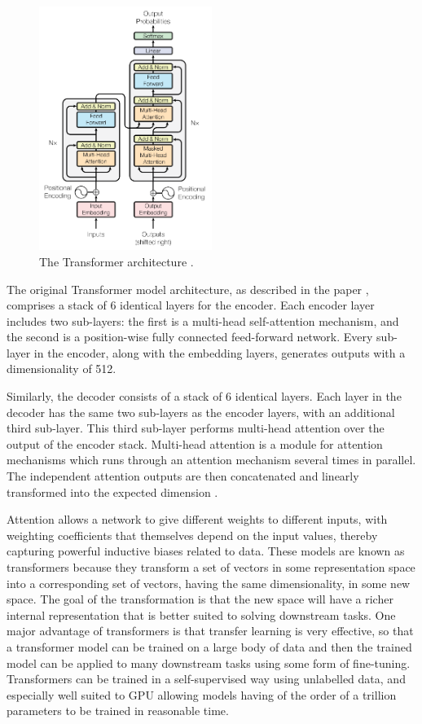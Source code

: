 \begin{figure}[h!]
\centering
\includegraphics[width=0.5\textwidth]{Figures/transformer.png}
\caption{The Transformer architecture \cite{Vaswani.12Jun2017}.}
\label{fig:transformer}
\end{figure}

The original Transformer model architecture, as described in the paper \cite{Vaswani.12Jun2017}, comprises a stack of 6 identical layers for the encoder. Each encoder layer includes two sub-layers: the first is a multi-head self-attention mechanism, and the second is a position-wise fully connected feed-forward network. Every sub-layer in the encoder, along with the embedding layers, generates outputs with a dimensionality of 512.

Similarly, the decoder consists of a stack of 6 identical layers. Each layer in the decoder has the same two sub-layers as the encoder layers, with an additional third sub-layer. This third sub-layer performs multi-head attention over the output of the encoder stack. Multi-head attention is a module for attention mechanisms which runs through an attention mechanism several times in parallel. The independent attention outputs are then concatenated and linearly transformed into the expected dimension \cite{Vaswani.12Jun2017}.

Attention allows a network to give different weights to different inputs, with weighting coefficients that themselves depend on the input values, thereby capturing powerful inductive biases related to data. These models are known as transformers because they transform a set of vectors in some representation space into a corresponding set of vectors, having the same dimensionality, in some new space. The goal of the transformation is that the new space will have a richer internal representation that is better suited to solving downstream tasks. One major advantage of transformers is that transfer learning is very effective, so that a transformer model can be trained on a large body of data and then the trained model can be applied to many downstream tasks using some form of fine-tuning. Transformers can be trained in a self-supervised way using unlabelled data, and especially well suited to GPU allowing models having of the order of a trillion parameters to be trained in reasonable time. \cite{Bishop.2024}

